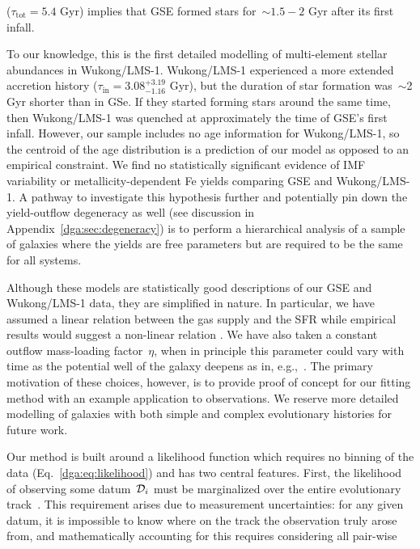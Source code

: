 ($\tau_\text{tot} = 5.4$ Gyr) implies that GSE formed stars for~$\sim$$1.5 - 2$
Gyr after its first infall.
\par
To our knowledge, this is the first detailed modelling of multi-element stellar
abundances in Wukong/LMS-1.
Wukong/LMS-1 experienced a more extended accretion history
($\tau_\text{in} = 3.08^{+3.19}_{-1.16}$ Gyr), but the duration of star
formation was~$\sim$2 Gyr shorter than in GSe.
If they started forming stars around the same time, then Wukong/LMS-1 was
quenched at approximately the time of GSE's first infall.
However, our sample includes no age information for Wukong/LMS-1, so the
centroid of the age distribution is a prediction of our model as opposed to an
empirical constraint.
We find no statistically significant evidence of IMF variability or
metallicity-dependent Fe yields comparing GSE and Wukong/LMS-1.
A pathway to investigate this hypothesis further and potentially pin down the
yield-outflow degeneracy as well (see discussion in
Appendix~\ref{dga:sec:degeneracy}) is to perform a hierarchical analysis of a
sample of galaxies where the yields are free parameters but are required to be
the same for all systems.
\par
{\sloppy
Although these models are statistically good descriptions of our GSE and
\linebreak Wukong/LMS-1 data, they are simplified in nature.
}
In particular, we have assumed a linear relation between the gas supply and the
SFR while empirical results would suggest a non-linear relation
\citep[e.g.,][]{Kennicutt1998, Kennicutt2012, delosReyes2019, Kennicutt2021}.
We have also taken a constant outflow mass-loading factor~$\eta$, when in
principle this parameter could vary with time as the potential well of the
galaxy deepens as in, e.g.,~\citet{Conroy2022}.
The primary motivation of these choices, however, is to provide proof of
concept for our fitting method with an example application to observations.
We reserve more detailed modelling of galaxies with both simple and complex
evolutionary histories for future work.
\par
Our method is built around a likelihood function which requires no binning of
the data (Eq.~\ref{dga:eq:likelihood}) and has two central features.
First, the likelihood of observing some datum~$\script{D}_i$ must be
marginalized over the entire evolutionary track~.
This requirement arises due to measurement uncertainties: for any given datum,
it is impossible to know where on the track the observation truly arose from,
and mathematically accounting for this requires considering all pair-wise
$$
